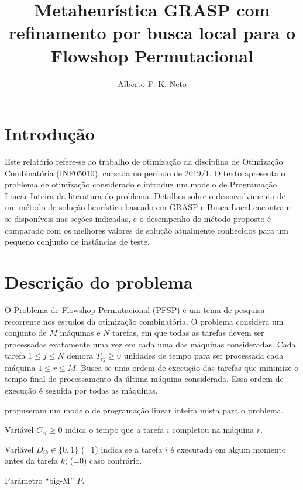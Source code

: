 \documentclass[12pt]{article}
\title{Metaheurística GRASP com refinamento por busca local para o Flowshop Permutacional}
\author{Alberto F. K. Neto\inst{1}}
\begin{document}
 

\maketitle

\section{Introdução}

Este relatório refere-se ao trabalho de otimização da disciplina de Otimização
Combinatória (INF05010), cursada no período de 2019/1. O texto apresenta o
problema de otimização considerado e introduz um modelo de Programação Linear
Inteira da literatura do problema. Detalhes sobre o desenvolvimento de um método
de solução heurístico baseado em GRASP e Busca Local encontram-se disponíveis
nas seções indicadas, e o desempenho do método proposto é comparado com os
melhores valores de solução atualmente conhecidos para um pequeno conjunto de
instâncias de teste. 

\section{Descrição do problema}

O Problema de Flowshop Permutacional (PFSP) é um tema de pesquisa recorrente
nos estudos da otimização combinatória. O problema considera um conjunto de 
$M$ máquinas e $N$ tarefas, em que todas as tarefas devem ser processadas 
exatamente uma vez em cada uma das máquinas consideradas. Cada tarefa 
$1 \leqslant j \leqslant N$ demora $T_{rj} \geqslant 0$ unidades de tempo para ser 
processada cada máquina $1 \leqslant r \leqslant M$. Busca-se uma ordem de
execução das tarefas que minimize o tempo final de processamento da última 
máquina considerada. Essa ordem de execução é seguida por todas as máquinas.

\cite{tseng2004-flowshop-models} propuseram um modelo de programação linear
inteira mista para o problema.


Variável $C_{ri} \geqslant 0$ indica o tempo que a tarefa $i$ completou na máquina $r$.

Variável $D_{ik} \in \{0,1\}$ (=1) indica se a tarefa $i$ é executada em algum momento antes da
tarefa $k$; (=0) caso contrário.

Parâmetro ``big-M'' $P$.
\end{document}
